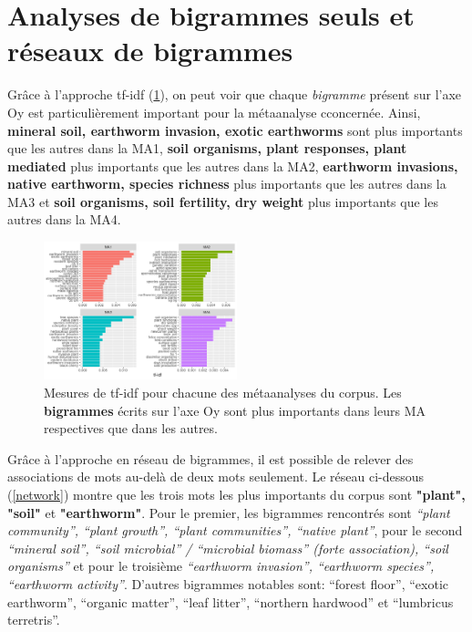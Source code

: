\documentclass{book}
\begin{document}
\section{Analyses de bigrammes seuls et réseaux de bigrammes}
\noindent
Grâce à l'approche tf-idf (\cref{bi_tf_idf}), on peut voir que chaque \textit{bigramme} présent sur l'axe Oy est particulièrement important pour la métaanalyse cconcernée. Ainsi, \textbf{mineral soil, earthworm invasion, exotic earthworms} sont plus importants que les autres dans la MA1, \textbf{soil organisms, plant responses, plant mediated} plus importants que les autres dans la MA2, \textbf{earthworm invasions, native earthworm, species richness} plus importants que les autres dans la MA3 et \textbf{soil organisms, soil fertility, dry weight} plus importants que les autres dans la MA4.
\begin{figure}[htb] %
    \begin{center} %
        \includegraphics[width=0.5\textwidth]{bigrammes_tf_idf.png}
        \caption[Mesures de tf-idf par bigramme pour chacune des métaanalyses du corpus]{Mesures de tf-idf pour chacune des métaanalyses du corpus. Les \textbf{bigrammes} écrits sur l'axe Oy sont plus importants dans leurs MA respectives que dans les autres.\label{bi_tf_idf}}
    \end{center}  
\end{figure}
\FloatBarrier{}

\newpage
Grâce à l'approche en réseau de bigrammes, il est possible de relever des associations de mots au-delà de deux mots seulement. Le réseau ci-dessous (\cref{network}) montre que les trois mots les plus importants du corpus sont \textbf{"plant", "soil"} et \textbf{"earthworm"}. Pour le premier, les bigrammes rencontrés sont \textit{“plant community”, “plant growth”, “plant communities”, “native plant”}, pour le second \textit{“mineral soil”, “soil microbial” / “microbial biomass” (forte association), “soil organisms”} et pour le troisième \textit{“earthworm invasion”, “earthworm species”, “earthworm activity”}. D'autres bigrammes notables sont: “forest floor”, “exotic earthworm”, “organic matter”, “leaf litter”, “northern hardwood” et “lumbricus terretris”.
\end{document}
